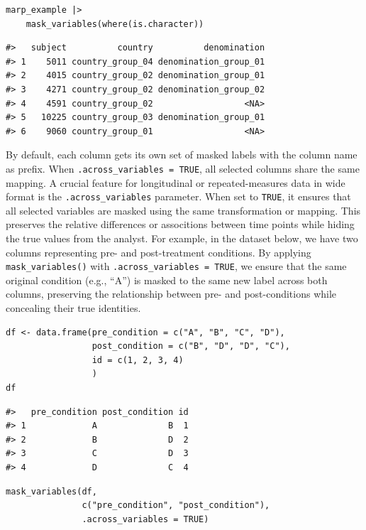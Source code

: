 \begin{verbatim}
marp_example |> 
    mask_variables(where(is.character))
\end{verbatim}

\begin{verbatim}
#>   subject          country          denomination
#> 1    5011 country_group_04 denomination_group_01
#> 2    4015 country_group_02 denomination_group_01
#> 3    4271 country_group_02 denomination_group_02
#> 4    4591 country_group_02                  <NA>
#> 5   10225 country_group_03 denomination_group_01
#> 6    9060 country_group_01                  <NA>
\end{verbatim}

By default, each column gets its own set of masked labels with the column name as prefix. When \texttt{.across\_variables\ =\ TRUE}, all selected columns share the same mapping. A crucial feature for longitudinal or repeated-measures data in wide format is the \texttt{.across\_variables} parameter. When set to \texttt{TRUE}, it ensures that all selected variables are masked using the same transformation or mapping. This preserves the relative differences or associtions between time points while hiding the true values from the analyst. For example, in the dataset below, we have two columns representing pre- and post-treatment conditions. By applying \texttt{mask\_variables()} with \texttt{.across\_variables\ =\ TRUE}, we ensure that the same original condition (e.g., ``A'') is masked to the same new label across both columns, preserving the relationship between pre- and post-conditions while concealing their true identities.

\begin{verbatim}
df <- data.frame(pre_condition = c("A", "B", "C", "D"),
                 post_condition = c("B", "D", "D", "C"),
                 id = c(1, 2, 3, 4)
                 )
df
\end{verbatim}

\begin{verbatim}
#>   pre_condition post_condition id
#> 1             A              B  1
#> 2             B              D  2
#> 3             C              D  3
#> 4             D              C  4
\end{verbatim}

\begin{verbatim}
mask_variables(df, 
               c("pre_condition", "post_condition"),
               .across_variables = TRUE)
\end{verbatim}

